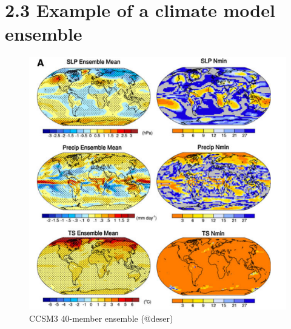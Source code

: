 \documentclass[
]{krantz}
\begin{document}
\section{2.3 Example of a climate model ensemble}\label{example-of-a-climate-model-ensemble}

\begin{figure}

{\centering \includegraphics[width=0.8\linewidth]{work/01-variability/figures/EnsembleSenta} 

}

\caption{CCSM3 40-member ensemble (@deser)}\label{fig:EnsembleSenta}
\end{figure}
\end{document}
